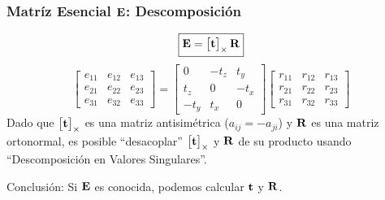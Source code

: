 \begin{frame}
    \frametitle{Matríz Esencial $\boldsymbol{\mathbf{E}}$: Descomposición}
    $$
    \boxed{\boldsymbol{\mathbf{E}} = \begin{bmatrix}\boldsymbol{\mathbf{t}}\end{bmatrix}_{\times} \boldsymbol{\mathbf{R}}}
    $$
    $$
    \begin{bmatrix}
        e_{11} & e_{12} & e_{13} \\
        e_{21} & e_{22} & e_{23} \\
        e_{31} & e_{32} & e_{33}
    \end{bmatrix} =
    \begin{bmatrix}
        0 & -t_z & t_y \\
        t_z & 0 & -t_x \\
        -t_y & t_x & 0
    \end{bmatrix}
    \begin{bmatrix}
        r_{11} & r_{12} & r_{13} \\
        r_{21} & r_{22} & r_{23} \\
        r_{31} & r_{32} & r_{33}
    \end{bmatrix}
    $$
    Dado que $\begin{bmatrix}\boldsymbol{\mathbf{t}}\end{bmatrix}_{\times}$ es una matriz antisimétrica ($a_{ij} = -a_{ji}$) y $\boldsymbol{\mathbf{R}}$ es una matriz ortonormal, es posible ``desacoplar'' $\begin{bmatrix}\boldsymbol{\mathbf{t}}\end{bmatrix}_{\times}$ y $\boldsymbol{\mathbf{R}}$ de su producto usando ``Descomposición en Valores Singulares''.

    \vspace{0.5cm}
    Conclusión: Si $\boldsymbol{\mathbf{E}}$ es conocida, podemos calcular $\boldsymbol{\mathbf{t}}$ y $\boldsymbol{\mathbf{R}}$.
\end{frame}




